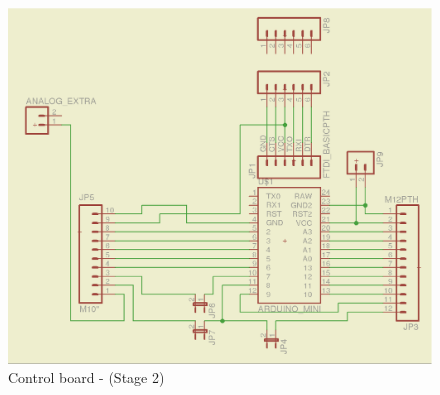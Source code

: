 \documentclass[12pt,a4paper,draft]{report}
\begin{document}
\begin{figure}[H]
\centering
\includegraphics*[scale=0.25]{control_brd_s2}
\caption{Control board -  (Stage 2)}
\label{Control-brd-s2}
\end{figure}
\ \\
\end{document}
